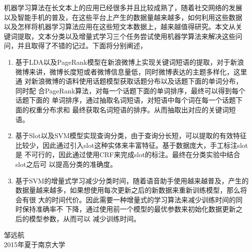 \documentclass[master]{njuthesis}
\begin{document}
%
\begin{preface}

机器学习算法在长文本上的应用已经很多并且比较成熟了，随着社交网络的发展
以及智能手机的普及，在这些平台上产生的数据量越来越多，如何利用这些数据
以及怎样将机器学习算法应用在这些短文本数据上，越来越值得研究。本文从关
键词提取，文本分类以及增量式学习三个任务尝试使用机器学算法来解决这些问
问，并且取得了不错的记过。下面将分别阐述，

\begin{enumerate}
\item 基于LDA以及PageRank模型在新浪微博上实现关键词短语的提取，对于新浪
微博来讲，微博长度短或者微博信息量低，同时微博表达的主题多样化，这里通
对新浪微博的语料使用话题模型获取话题分布以及话题下面的单词分布，同时配
合PageRank算法，对每一个话题下面的单词排序，最终可以得到每个话题下面的
单词排序，通过抽取名词短语，对短语中每个词在每一个话题下面的权重分布求和
最终获取名词短语的排序。从而抽取出对应的关键词短语。

\item 基于Slot以及SVM模型实现查询分类，由于查询分长短，可以提取的有效特征
比较少，因此通过引入slot这种实体来丰富特征。基于数据庞大，手工标注slot是
不可行的，因此通过使用CRF来完成slot的标注。最终在分类实验中结合slot之后可
以提高分类的准确度。

\item 基于SVM的增量式学习减少分类时间，随着语音助手使用越来越普及，产生的
数据量越来越多，如果想使用每次更新之后的新数据来重新训练模型，那么将会有很
大的时间代价。因此需要一种增量式的学习算法来减少训练时间的同时保持准确率不
下降，通过使用前一个模型的最优参数来初始化数据更新之后的模型参数，从而可以
减少训练时间。
\end{enumerate}


\vspace{1cm}
\begin{flushright}
邹远航\\
2015年夏于南京大学
\end{flushright}

\end{preface}

\tableofcontents

\listoffigures
\end{document}
